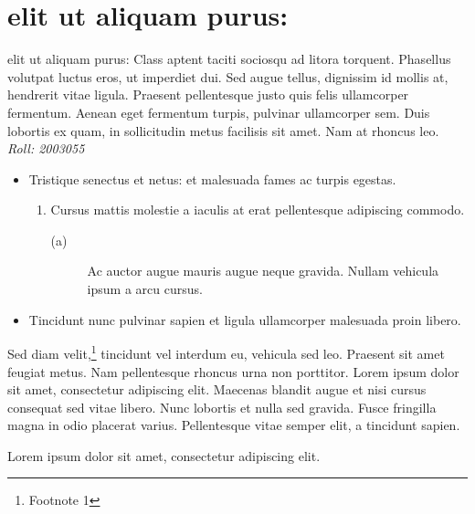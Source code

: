 \documentclass{book}
\begin{document}
\section[1]{elit ut aliquam purus:}
\begin{minipage}
    elit ut aliquam purus: Class aptent taciti sociosqu ad litora torquent.
Phasellus volutpat luctus eros, ut imperdiet dui. 
Sed augue tellus, dignissim id mollis at, hendrerit vitae ligula. 
Praesent pellentesque justo quis felis ullamcorper fermentum. 
Aenean eget fermentum turpis, pulvinar ullamcorper sem. 
Duis lobortis ex quam, in sollicitudin metus facilisis sit amet. Nam at rhoncus leo.
\newline
\emph{Roll: 2003055}
\begin{itemize}
    \item Tristique senectus et netus: et malesuada fames ac turpis egestas.
    \begin{enumerate}
        \item  Cursus mattis molestie a iaculis at erat pellentesque adipiscing commodo.
        \begin{description}
            \item[(a)]Ac auctor augue mauris augue neque gravida. Nullam vehicula ipsum a arcu cursus.
        \end{description}
    \end{enumerate}
    
    \item Tincidunt nunc pulvinar sapien et ligula ullamcorper malesuada proin libero.
\end{itemize}
 

Sed diam velit,\footnote[1]{Footnote 1} tincidunt vel interdum eu, vehicula sed leo. 
Praesent sit amet feugiat metus. Nam pellentesque rhoncus urna non porttitor. 
Lorem ipsum dolor sit amet, consectetur adipiscing elit. 
Maecenas blandit augue et nisi cursus consequat sed vitae libero. 
Nunc lobortis et nulla sed gravida. Fusce fringilla magna in odio placerat varius. 
Pellentesque vitae semper elit, a tincidunt sapien. 
\begin{flushright}
    Lorem ipsum dolor sit amet, consectetur adipiscing elit.
\end{flushright}
\end{minipage}
\end{document}
